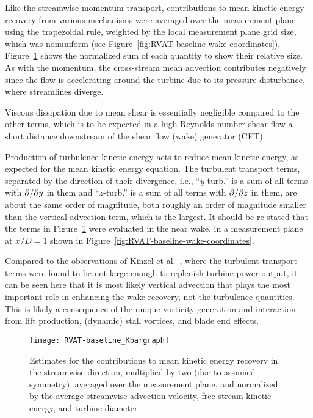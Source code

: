 Like the streamwise momentum transport, contributions to mean kinetic energy
recovery from various mechanisms were averaged over the  measurement plane using
the trapezoidal rule, weighted by the local measurement plane grid size, which
was nonuniform (see Figure~\ref{fig:RVAT-baseline-wake-coordinates}).
Figure~\ref{fig:RVAT-baseline-Kbargraph} shows the normalized sum of each
quantity to show their relative size. As with the momentum, the cross-stream
mean advection contributes negatively since the flow is accelerating around the
turbine due to its pressure disturbance, where streamlines diverge.

Viscous dissipation due to mean shear is essentially negligible compared to
the other terms, which is to be expected in a high Reynolds number shear flow a
short distance downstream of the shear flow (wake) generator (CFT).

Production of turbulence kinetic energy acts to reduce mean kinetic energy, as
expected for the mean kinetic energy equation. The turbulent transport terms,
separated by the direction of their divergence, i.e., ``$y$-turb.'' is a sum of
all terms with $\partial / \partial y$ in them and ``$z$-turb.'' is a sum of all terms with
$\partial / \partial z$ in them, are about the same order of magnitude, both roughly an
order of magnitude smaller than the vertical advection term, which is the
largest. It should be re-stated that the terms in
Figure~\ref{fig:RVAT-baseline-Kbargraph} were evaluated in the near wake, in a
measurement plane at $x/D=1$ shown in
Figure~\ref{fig:RVAT-baseline-wake-coordinates}.

Compared to the observations of Kinzel et al.~\cite{Kinzel2012}, where the
turbulent transport terms were found to be not large enough to replenish turbine
power output, it can be seen here that it is most likely vertical advection that
plays the most important role in enhancing the wake recovery, not the turbulence
quantities. This is likely a consequence of the unique vorticity generation and
interaction from lift production, (dynamic) stall vortices, and blade end
effects.

\begin{figure}
    \centering

    \texttt{[image: RVAT-baseline\_Kbargraph]}

    \caption{Estimates for the contributions to mean kinetic energy recovery in
        the streamwise direction, multiplied by two (due to assumed symmetry),
        averaged over the measurement plane, and normalized by the average
        streamwise advection velocity, free stream kinetic energy, and turbine
        diameter.}

    \label{fig:RVAT-baseline-Kbargraph}
\end{figure}


